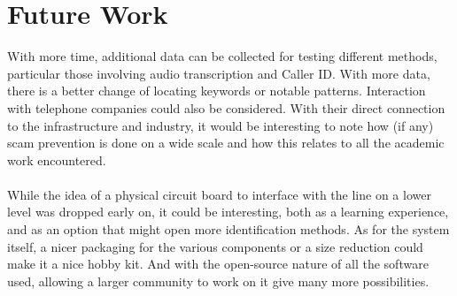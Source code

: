 \documentclass[main.tex]{subfiles}
\begin{document}
\section{Future Work}
With more time, additional data can be collected for testing different methods, particular those involving audio transcription and Caller ID. With more data, there is a better change of locating keywords or notable patterns. Interaction with telephone companies could also be considered. With their direct connection to the infrastructure and industry, it would be interesting to note how (if any) scam prevention is done on a wide scale and how this relates to all the academic work encountered.
\\\\
While the idea of a physical circuit board to interface with the line on a lower level was dropped early on, it could be interesting, both as a learning experience, and as an option that might open more identification methods. As for the system itself, a nicer packaging for the various components or a size reduction could make it a nice hobby kit. And with the open-source nature of all the software used, allowing a larger community to work on it give many more possibilities.
\end{document}
